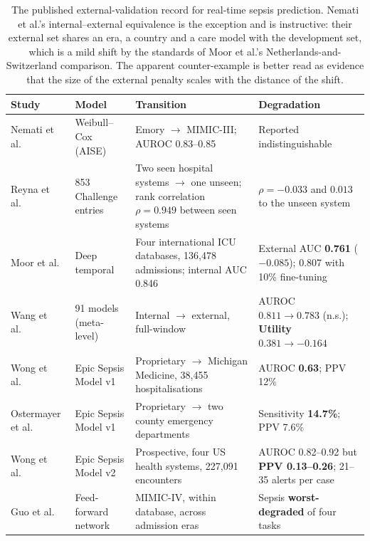 \begin{table}[H]
    \centering\small
    \begin{tabularx}{\textwidth}{p{2.6cm}p{2.5cm}Xp{2.9cm}}
    \toprule
    \textbf{Study} & \textbf{Model} & \textbf{Transition} &
    \textbf{Degradation} \\
    \midrule
    Nemati et al.\ \cite{nemati2018aise} & Weibull--Cox (AISE) &
    Emory $\rightarrow$ MIMIC-III; AUROC 0.83--0.85 &
    Reported indistinguishable \\
    \addlinespace
    Reyna et al.\ \cite{reyna2020utility} & 853 Challenge entries &
    Two seen hospital systems $\rightarrow$ one unseen; rank correlation
    $\rho = 0.949$ between seen systems &
    $\rho = -0.033$ and $0.013$ to the unseen system \\
    \addlinespace
    Moor et al.\ \cite{moor2023review} & Deep temporal &
    Four international ICU databases, 136,478 admissions; internal AUC 0.846 &
    External AUC \textbf{0.761} ($-0.085$); 0.807 with 10\% fine-tuning \\
    \addlinespace
    Wang et al.\ \cite{wang2025srpm} & 91 models (meta-level) &
    Internal $\rightarrow$ external, full-window &
    AUROC $0.811 \rightarrow 0.783$ (n.s.); \textbf{Utility
    $0.381 \rightarrow -0.164$} \\
    \addlinespace
    Wong et al.\ \cite{wong2021epic} & Epic Sepsis Model v1 &
    Proprietary $\rightarrow$ Michigan Medicine, 38,455 hospitalisations &
    AUROC \textbf{0.63}; PPV 12\% \\
    \addlinespace
    Ostermayer et al.\ \cite{ostermayer2024external} & Epic Sepsis Model v1 &
    Proprietary $\rightarrow$ two county emergency departments &
    Sensitivity \textbf{14.7\%}; PPV 7.6\% \\
    \addlinespace
    Wong et al.\ \cite{wong2026epic} & Epic Sepsis Model v2 &
    Prospective, four US health systems, 227,091 encounters &
    AUROC 0.82--0.92 but \textbf{PPV 0.13--0.26}; 21--35 alerts per case \\
    \addlinespace
    Guo et al.\ \cite{guo2022temporal} & Feed-forward network &
    MIMIC-IV, within database, across admission eras &
    Sepsis \textbf{worst-degraded} of four tasks \\
    \bottomrule
    \end{tabularx}
    \caption{The published external-validation record for real-time sepsis
    prediction. Nemati et al.'s internal--external equivalence is the exception
    and is instructive: their external set shares an era, a country and a care
    model with the development set, which is a mild shift by the standards of
    Moor et al.'s Netherlands-and-Switzerland comparison. The apparent
    counter-example is better read as evidence that the size of the external
    penalty scales with the distance of the shift.}
    \label{tab:generalisation}
\end{table}

